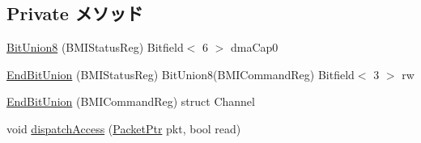 \subsection*{Private メソッド}
\begin{DoxyCompactItemize}
\item 
\hyperlink{classIdeController_a72e04acd6bb1c97077b13a250648674e}{BitUnion8} (BMIStatusReg) Bitfield$<$ 6 $>$ dmaCap0
\item 
\hyperlink{classIdeController_af3c5b204b2ea4a04c542ab8f915dae04}{EndBitUnion} (BMIStatusReg) BitUnion8(BMICommandReg) Bitfield$<$ 3 $>$ rw
\item 
\hyperlink{classIdeController_a104cf32518c5d5e9cd2b85d06e4783a9}{EndBitUnion} (BMICommandReg) struct Channel
\item 
void \hyperlink{classIdeController_ada0391144816c248c9824a65d02e9bad}{dispatchAccess} (\hyperlink{classPacket}{PacketPtr} pkt, bool read)
\end{DoxyCompactItemize}

